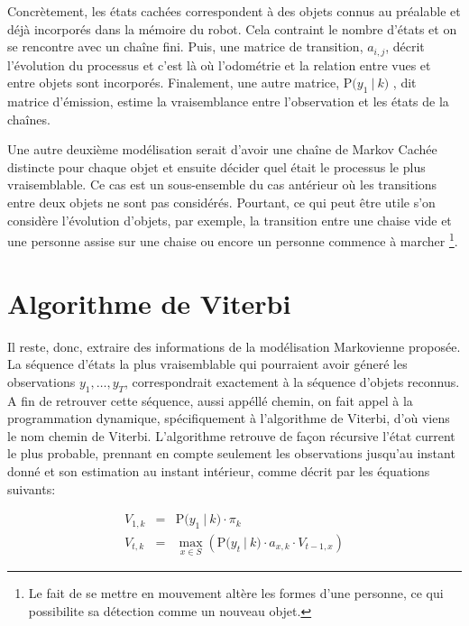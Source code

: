Concrètement, les états cachées correspondent à des objets connus au
préalable et déjà incorporés dans la mémoire du robot. Cela contraint le
nombre d'états et on se rencontre avec un chaîne fini. Puis, une
matrice de transition, $a_{i,j}$, décrit l'évolution du processus et c'est là où
l'odométrie et la relation entre vues et entre objets sont
incorporés. Finalement, une autre matrice, $\mathrm{P}\big( y_1 \ | \ k \big)$
, dit matrice d'émission, estime la vraisemblance entre l'observation
et les états de la chaînes.

Une autre deuxième modélisation serait d'avoir une chaîne de Markov
Cachée distincte pour chaque objet et ensuite décider quel était le
processus le plus vraisemblable. Ce cas est un sous-ensemble du cas
antérieur où les transitions entre deux objets ne sont pas
considérés. Pourtant, ce qui peut être utile s'on considère
l'évolution d'objets, par exemple, la transition entre une chaise vide
et une personne assise sur une chaise ou encore un personne
commence à marcher \footnote{Le fait de se mettre en mouvement
  altère les formes d'une personne, ce qui possibilite sa détection
  comme un nouveau objet.}.

\section{Algorithme de Viterbi}

Il reste, donc, extraire des informations de la modélisation Markovienne proposée.
La séquence d'états la plus vraisemblable qui pourraient avoir géneré
les observations  $y_1,\dots, y_T$, correspondrait exactement à la séquence d'objets reconnus.
A fin de retrouver cette séquence, aussi appéllé chemin, on fait 
appel à la programmation dynamique, spécifiquement à l'algorithme de Viterbi, d'où viens le nom chemin de Viterbi.
L'algorithme retrouve de façon récursive l'état current le plus probable, 
prennant en compte seulement les observations jusqu'au instant donné et son
estimation au instant intérieur, comme décrit par les équations suivants:

\begin{equation*}
  \begin{array}{rcl}
    V_{1,k} &=& \mathrm{P}\big( y_1 \ | \ k \big) \cdot \pi_k \\
    V_{t,k} &=& \max_{x \in S} \left(  \mathrm{P}\big( y_t \ | \ k \big) \cdot a_{x,k} \cdot V_{t-1,x}\right)
  \end{array}
\end{equation*}

